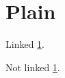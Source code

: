 \documentclass{article}
\begin{document}
\section{Plain}\label{sec:p}
Linked \ref{sec:p}.
\begin{NoHyper}
Not linked \ref{sec:p}.
\end{NoHyper}
\end{document}
